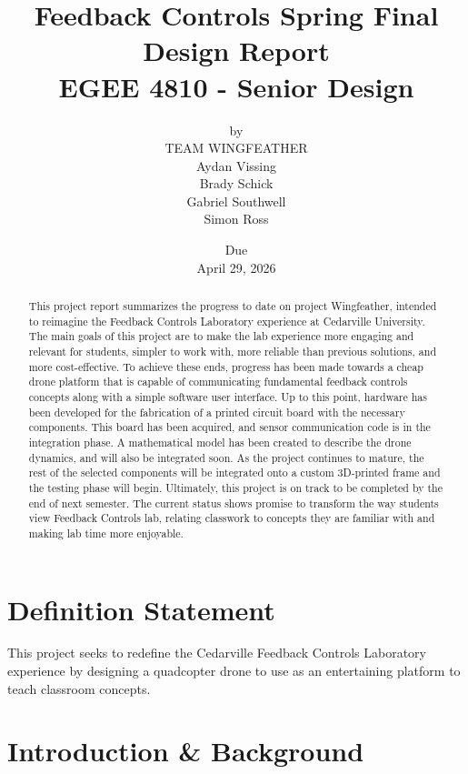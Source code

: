 \documentclass[12pt, titlepage]{article}
\title{\Huge Feedback Controls Spring Final Design Report \\ \normalsize{EGEE 4810 - Senior Design}}
\author{by \\ \Large TEAM WINGFEATHER \\ Aydan Vissing \\ Brady Schick \\ Gabriel Southwell \\ Simon Ross}
\date{\footnotesize{Due} \\ \normalsize{April 29, 2026}}
\begin{document}
\maketitle


\begin{abstract}
This project report summarizes the progress to date on project Wingfeather, intended to reimagine the Feedback Controls Laboratory experience at Cedarville University. The main goals of this project are to make the lab experience more engaging and relevant for students, simpler to work with, more reliable than previous solutions, and more cost-effective. To achieve these ends, progress has been made towards a cheap drone platform that is capable of communicating fundamental feedback controls concepts along with a simple software user interface. Up to this point, hardware has been developed for the fabrication of a printed circuit board with the necessary components. This board has been acquired, and sensor communication code is in the integration phase. A mathematical model has been created to describe the drone dynamics, and will also be integrated soon. As the project continues to mature, the rest of the selected components will be integrated onto a custom 3D-printed frame and the testing phase will begin. Ultimately, this project is on track to be completed by the end of next semester. The current status shows promise to transform the way students view Feedback Controls lab, relating classwork to concepts they are familiar with and making lab time more enjoyable.


\end{abstract}

\newpage
\tableofcontents

\newpage
\section{Definition Statement}

This project seeks to redefine the Cedarville Feedback Controls Laboratory experience by designing a quadcopter drone to use as an entertaining platform to teach classroom concepts. 

\section{Introduction \& Background}
\end{document}
